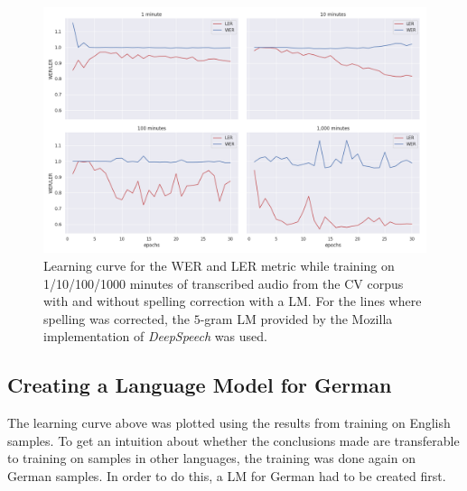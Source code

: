 \begin{figure}
	\includegraphics[width=\linewidth]{./img/lc_metrics_cv.png}
	\caption{Learning curve for the \ac{WER} and \ac{LER} metric while training on 1/10/100/1000 minutes of transcribed audio from the \ac{CV} corpus with and without spelling correction with a \ac{LM}. For the lines where spelling was corrected, the $5$-gram \ac{LM} provided by the Mozilla implementation of \textit{DeepSpeech} was used.}
	\label{lc_metrics_cv}
\end{figure}

%
%
%
%
%
%

\subsection{Creating a Language Model for German}

The learning curve above was plotted using the results from training on English samples. To get an intuition about whether the conclusions made are transferable to training on samples in other languages, the training was done again on German samples. In order to do this, a \ac{LM} for German had to be created first.

